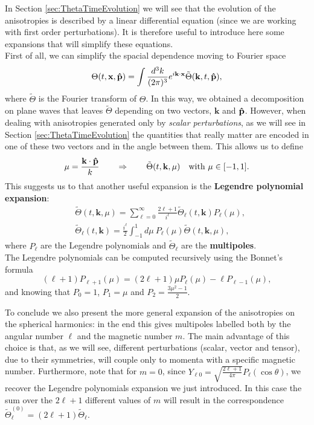 In Section \ref{sec:ThetaTimeEvolution} we will see that the evolution of the anisotropies is described by a linear differential equation (since we are working with first order perturbations). It is therefore useful to introduce here some expansions that will simplify these equations.\\
First of all, we can simplify the spacial dependence moving to Fourier space
\begin{equation}\label{eq:fourier_expansion}
    \Theta(t,\mathbf x,\mathbf{\hat{p}}) = \int \frac{d^3k}{(2\pi)^3}e^{i\mathbf{k}\cdot\mathbf{x}}\tilde\Theta(\mathbf{k},t,\mathbf{\hat{p}}),
\end{equation} 
where $\tilde\Theta$ is the Fourier transform of $\Theta$.
In this way, we obtained a decomposition on plane waves that leaves $\tilde\Theta$ depending on two vectors, $\mathbf k$ and $\mathbf{\hat{p}}$. However, when dealing with anisotropies generated only by \emph{scalar perturbations}, as we will see in Section \ref{sec:ThetaTimeEvolution} the quantities that really matter are encoded in one of these two vectors and in the angle between them. This allows us to define $$\mu=\frac{\mathbf{k}\cdot \mathbf{\hat{p}}}{k}\qquad\Rightarrow\qquad \tilde\Theta(t,\mathbf k,\mu)\quad \text{with } \mu\in[-1,1].$$
This suggests us to that another useful expansion is the \textbf{Legendre polynomial expansion}:
\begin{align}\label{eq:legendre_expansion}
    &\tilde\Theta(t,\mathbf k,\mu) = \sum_{\ell=0}^{\infty}\frac{2\ell+1}{i^\ell} \tilde\Theta_{\ell}(t,\mathbf{k})P_{\ell}(\mu),\\
    &\tilde\Theta_{\ell}(t,\mathbf{k}) =\frac{i^\ell}{2} \int_{-1}^{1}d\mu\ P_{\ell}(\mu)\tilde\Theta(t,\mathbf k,\mu)\nonumber,
\end{align} 
where $P_{\ell}$ are the Legendre polynomials and $\tilde\Theta_\ell$ are the \textbf{multipoles}.\\
The Legendre polynomials can be computed recursively using the Bonnet's formula
\begin{equation}\label{eq:bonnet}
    (\ell+1)P_{\ell+1}(\mu) = (2\ell+1)\mu P_{\ell}(\mu)-\ell P_{\ell-1}(\mu),
\end{equation}
and knowing that $P_0=1$, $P_1=\mu$ and $P_2=\frac{3\mu^2-1}{2}$.

To conclude we also present the more general expansion of the anisotropies on the spherical harmonics: in the end this gives multipoles labelled both by the angular number $\ell$ and the magnetic number $m$. The main advantage of this choice is that, as we will see, different perturbations (scalar, vector and tensor), due to their symmetries, will couple only to momenta with a specific magnetic number. Furthermore, note that for $m=0$, since $Y_{\ell 0}=\sqrt{\frac{2\ell+1}{4\pi}}P_\ell(\cos\theta)$, we recover the Legendre polynomials expansion we just introduced. In this case the sum over the $2\ell+1$ different values of $m$ will result in the correspondence $\tilde \Theta_\ell^{(0)}=(2\ell+1)\tilde\Theta_{\ell}$.

